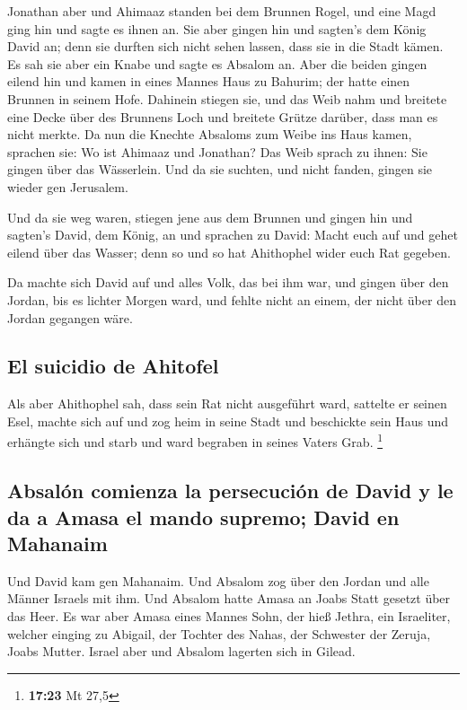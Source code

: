  Jonathan aber und Ahimaaz standen bei dem Brunnen Rogel,
und eine Magd ging hin und sagte es ihnen an. Sie aber gingen hin und
sagten's dem König David an; denn sie durften sich nicht sehen lassen,
dass sie in die Stadt kämen.  Es sah sie aber ein Knabe
und sagte es Absalom an. Aber die beiden gingen eilend hin und kamen in
eines Mannes Haus zu Bahurim; der hatte einen Brunnen in seinem Hofe.
Dahinein stiegen sie,  und das Weib nahm und breitete
eine Decke über des Brunnens Loch und breitete Grütze darüber, dass man
es nicht merkte.  Da nun die Knechte Absaloms zum Weibe
ins Haus kamen, sprachen sie: Wo ist Ahimaaz und Jonathan? Das Weib
sprach zu ihnen: Sie gingen über das Wässerlein. Und da sie suchten, und
nicht fanden, gingen sie wieder gen Jerusalem.

 Und da sie weg waren, stiegen jene aus dem Brunnen und
gingen hin und sagten's David, dem König, an und sprachen zu David:
Macht euch auf und gehet eilend über das Wasser; denn so und so hat
Ahithophel wider euch Rat gegeben.

 Da machte sich David auf und alles Volk, das bei ihm
war, und gingen über den Jordan, bis es lichter Morgen ward, und fehlte
nicht an einem, der nicht über den Jordan gegangen wäre.

\hypertarget{el-suicidio-de-ahitofel}{%
\subsection{El suicidio de Ahitofel}\label{el-suicidio-de-ahitofel}}

 Als aber Ahithophel sah, dass sein Rat nicht ausgeführt
ward, sattelte er seinen Esel, machte sich auf und zog heim in seine
Stadt und beschickte sein Haus und erhängte sich und starb und ward
begraben in seines Vaters Grab. \footnote{\textbf{17:23} Mt 27,5}

\hypertarget{absaluxf3n-comienza-la-persecuciuxf3n-de-david-y-le-da-a-amasa-el-mando-supremo-david-en-mahanaim}{%
\subsection{Absalón comienza la persecución de David y le da a Amasa el
mando supremo; David en
Mahanaim}\label{absaluxf3n-comienza-la-persecuciuxf3n-de-david-y-le-da-a-amasa-el-mando-supremo-david-en-mahanaim}}

 Und David kam gen Mahanaim. Und Absalom zog über den
Jordan und alle Männer Israels mit ihm.  Und Absalom
hatte Amasa an Joabs Statt gesetzt über das Heer. Es war aber Amasa
eines Mannes Sohn, der hieß Jethra, ein Israeliter, welcher einging zu
Abigail, der Tochter des Nahas, der Schwester der Zeruja, Joabs Mutter.
 Israel aber und Absalom lagerten sich in Gilead.

